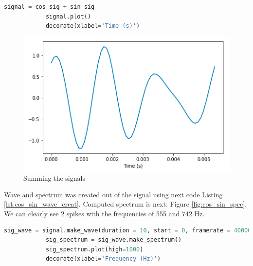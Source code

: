 \documentclass[a4paper]{article}
\begin{document}
        \begin{lstlisting}[language=Python,caption=Summing the signals,label={lst:cos_sin_summing}]
            signal = cos_sig + sin_sig
            signal.plot()
            decorate(xlabel='Time (s)')
        \end{lstlisting}
            
        \begin{figure}[H]
            \centering
            \includegraphics[width=\textwidth]{img/cos_sin_sum.png}
            \caption{Summing the signals}
            \label{fig:cos_sin_comb_wave}
        \end{figure}
        
        
            
        Wave and spectrum was created out of the signal using next code Listing \ref{lst:cos_sin_wave_creat}. Computed spectrum is next: Figure \ref{fig:cos_sin_spec}. We can clearly see 2 spikes with the frequencies of 555 and 742 Hz.
            
        \begin{lstlisting}[language=Python,caption=Creating a wave and a spectrum,label={lst:cos_sin_wave_creat}]
            sig_wave = signal.make_wave(duration = 10, start = 0, framerate = 400000)
            sig_spectrum = sig_wave.make_spectrum()
            sig_spectrum.plot(high=1000)
            decorate(xlabel='Frequency (Hz)')
        \end{lstlisting}    
            
\end{document}
